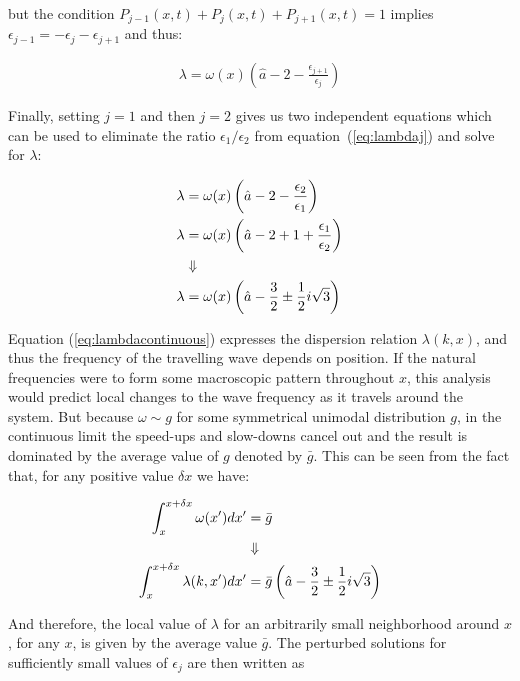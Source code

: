 \noindent but the condition $P_{j-1}(x,t)+P_j(x,t)+P_{j+1}(x,t)=1$ implies $\epsilon_{j-1}=-\epsilon_j-\epsilon_{j+1}$ and thus:

\begin{align}
  \lambda = \omega(x)\left( \hat{a}-2 - \frac{\epsilon_{j+1}}{\epsilon_j} \right)
  \label{eq:lambdaj}
\end{align}

Finally, setting $j=1$ and then $j=2$ gives us two independent equations which can be used to eliminate the ratio
$\epsilon_1/\epsilon_2$ from equation~(\ref{eq:lambdaj}) and solve for $\lambda$:

\begin{align}
  \lambda &= \omega(x)\left( \hat{a} - 2 - \frac{\epsilon_2}{\epsilon_1} \right) \notag \\
  \lambda &= \omega(x)\left( \hat{a} - 2 + 1 + \frac{\epsilon_1}{\epsilon_2} \right) \notag \\
  &\Downarrow \notag \\
  \lambda &= \omega(x)\left( \hat{a} - \frac{3}{2} \pm \frac{1}{2}i\sqrt{3} \right)
  \label{eq:lambdacontinuous}
\end{align}

Equation (\ref{eq:lambdacontinuous}) expresses the dispersion relation $\lambda(k,x)$, and thus the frequency of the travelling wave
depends on position. If the natural frequencies were to form some macroscopic pattern throughout $x$, this analysis would predict local
changes to the wave frequency as it travels around the system. But because $\omega \sim g$ for some symmetrical unimodal distribution
$g$, in the continuous limit the speed-ups and slow-downs cancel out and the result is dominated by the average value of $g$ denoted by
$\bar{g}$. This can be seen from the fact that, for any positive value $\delta x$ we have:

\begin{align}
  \int_x^{x+\delta x} \omega(x')dx' &= \bar{g} \notag\\
  & \Downarrow \notag\\
  \int_x^{x+\delta x} \lambda(k,x')dx' &= \bar{g} \left( \hat{a} - \frac{3}{2} \pm \frac{1}{2}i\sqrt{3} \right)
\end{align}

And therefore, the local value of $\lambda$ for an arbitrarily small neighborhood around $x$, for any $x$, is given by the average
value $\bar{g}$. The perturbed solutions for sufficiently small values of $\epsilon_j$ are then written as

